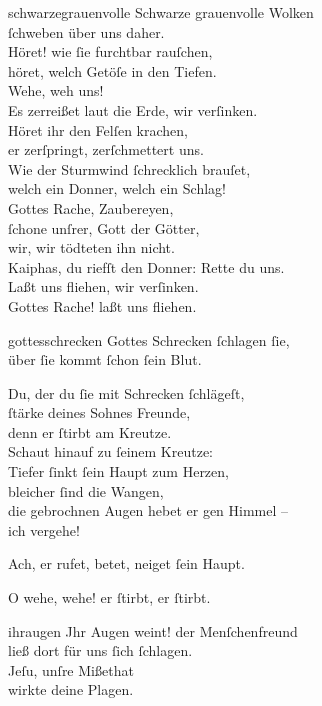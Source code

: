 \documentclass[abbrwidth=6em,tocstyle=ref-genre,toe=false]{ees}
\begin{document}
{\begin{movement}{schwarzegrauenvolle}
  Schwarze grauenvolle Wolken\\
  ſchweben über uns daher.\\
  Höret! wie ſie furchtbar rauſchen,\\
  höret, welch Getöſe in den Tiefen.\\
  Wehe, weh uns!\\
  Es zerreißet laut die Erde, wir verſinken.\\
  Höret ihr den Felſen krachen,\\
  er zerſpringt, zerſchmettert uns.\\
  Wie der Sturmwind ſchrecklich brauſet,\\
  welch ein Donner, welch ein Schlag!\\
  Gottes Rache, Zaubereyen,\\
  ſchone unſrer, Gott der Götter,\\
  wir, wir tödteten ihn nicht.\\
  Kaiphas, du riefſt den Donner: Rette du uns.\\
  Laßt uns fliehen, wir verſinken.\\
  Gottes Rache! laßt uns fliehen.
\end{movement}

\begin{movement}{gottesschrecken}
  \voice[Nikodemus]
  Gottes Schrecken ſchlagen ſie,\\
  über ſie kommt ſchon ſein Blut.

  \voice[Johannes]
  Du, der du ſie mit Schrecken ſchlägeſt,\\
  ſtärke deines Sohnes Freunde,\\
  denn er ſtirbt am Kreutze.\\
  Schaut hinauf zu ſeinem Kreutze:\\
  Tiefer ſinkt ſein Haupt zum Herzen,\\
  bleicher ſind die Wangen,\\
  die gebrochnen Augen hebet er gen Himmel –\\
  ich vergehe!

  \voice[Nikodemus]
  Ach, er rufet, betet, neiget ſein Haupt.

  \voice[Chor]
  O wehe, wehe! er ſtirbt, er ſtirbt.
\end{movement}
\enlargethispage\baselineskip
\begin{movement}{ihraugen}
  \voice[Chor]
  Jhr Augen weint! der Menſchenfreund\\
  ließ dort für uns ſich ſchlagen.\\
  Jeſu, unſre Mißethat\\
  wirkte deine Plagen.


\end{movement}}
\end{document}
